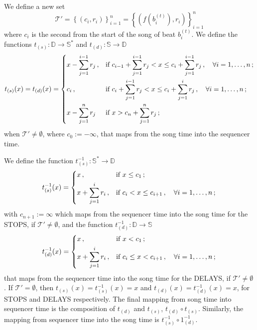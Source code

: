 \documentclass[a4paper,9pt]{article}
\begin{document}
We define a new set 
\begin{equation}
	\mathcal{T'} = \left\{\left( c_i, r_i \right)\right\}_{i=1}^{n} = \left\{\left( f\left( b_i^{(t)}\right), r_i \right)\right\}_{i=1}^{n}
	\label{eq:tprimeset}
\end{equation}
where $ c_i $ is the second from the start of the song of beat $ b_i^{(t)} $.
We define the functions $ t_{(s)}: \mathbb{D}\rightarrow \mathbb{S^{*}} $ and $ t_{(d)}: \mathbb{S}\rightarrow \mathbb{D} $
\begin{equation}
	t_{(s)}(x) = t_{(d)}(x) = \begin{dcases}
		x - \sum_{j=1}^{i-1}r_j\,, & \text{if $ c_{i-1} + \sum_{j=1}^{i-1}r_j < x \leq c_i + \sum_{j=1}^{i-1}r_j\,, \quad \forall i=1,\dots,n$}\,;\\
		c_i\,, & \text{if $ c_i + \sum_{j=1}^{i-1}r_j < x \leq c_i + \sum_{j=1}^i r_j\,,\quad \forall i=1,\dots,n $}\,;\\
		x - \sum_{j=1}^n r_j & \text{if $ x > c_n + \sum_{j=1}^n r_j $}\,; 
	\end{dcases}
	\label{eq:t}
\end{equation}
when $ \mathcal{T'} \neq \emptyset $, where $ c_0 := -\infty $,  that maps from the song time into the sequencer time. 

We define the function $ t_{(s)}^{-1}: \mathbb{S^{*}}\rightarrow \mathbb{D} $
\begin{equation}
	t_{(s)}^{-1}(x) = \begin{dcases}
		x\,, & \text{if $ x \leq c_1 $}\,;\\
		x+ \sum_{j=1}^{i}r_i\,, & \text{if $ c_i < x \leq c_{i+1}\,,\quad \forall i=1,\dots,n$}\,;\\
	\end{dcases}
	\label{eq:t-1s}
\end{equation}
with $ c_{n+1} := \infty $ which maps from the sequencer time into the song time for the STOPS, if $ \mathcal{T'} \neq \emptyset $, and the function $ t_{(d)}^{-1}: \mathbb{D}\rightarrow \mathbb{S} $
\begin{equation}
	t_{(d)}^{-1}(x) = \begin{dcases}
		x\,, & \text{if $ x < c_1 $}\,;\\
		x+ \sum_{j=1}^{i}r_i\,, & \text{if $ c_i \leq x < c_{i+1}\,,\quad \forall i=1,\dots,n$}\,;\\
	\end{dcases}
	\label{eq:t-1s}
\end{equation}
that maps from the sequencer time into the song time for the DELAYS, if $ \mathcal{T'}\neq \emptyset $. If $ \mathcal{T'} = \emptyset $, then $ t_{(s)}(x) = t_{(s)}^{-1}(x) = x$ and $t_{(d)}(x) = t_{(d)}^{-1} (x) = x $, for STOPS and DELAYS respectively.
The final mapping from song time into sequencer time is the composition of $t_{(d)}$ and $ t_{(s)} $, $ t_{(d)}\circ t_{(s)} $. Similarly, the mapping from sequencer time into the song time is $ t_{(s)}^{-1}\circ 1_{(d)}^{-1} $.
\end{document}
